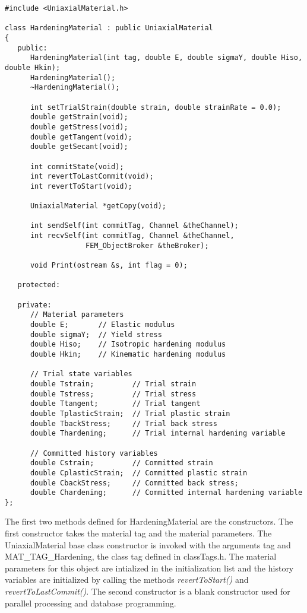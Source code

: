 \documentclass[12pt]{article}
\begin{document}
{\sf\small
\begin{verbatim}
#include <UniaxialMaterial.h>

class HardeningMaterial : public UniaxialMaterial
{
   public:
      HardeningMaterial(int tag, double E, double sigmaY, double Hiso, double Hkin);
      HardeningMaterial();
      ~HardeningMaterial();

      int setTrialStrain(double strain, double strainRate = 0.0); 
      double getStrain(void);          
      double getStress(void);
      double getTangent(void);
      double getSecant(void);

      int commitState(void);
      int revertToLastCommit(void);    
      int revertToStart(void);        

      UniaxialMaterial *getCopy(void);
    
      int sendSelf(int commitTag, Channel &theChannel);  
      int recvSelf(int commitTag, Channel &theChannel, 
                   FEM_ObjectBroker &theBroker);    
    
      void Print(ostream &s, int flag = 0);
    
   protected:
    
   private:
      // Material parameters
      double E;       // Elastic modulus
      double sigmaY;  // Yield stress
      double Hiso;    // Isotropic hardening modulus
      double Hkin;    // Kinematic hardening modulus
	
      // Trial state variables
      double Tstrain;         // Trial strain
      double Tstress;         // Trial stress
      double Ttangent;        // Trial tangent
      double TplasticStrain;  // Trial plastic strain
      double TbackStress;     // Trial back stress
      double Thardening;      // Trial internal hardening variable
	
      // Committed history variables
      double Cstrain;         // Committed strain
      double CplasticStrain;  // Committed plastic strain
      double CbackStress;     // Committed back stress;
      double Chardening;      // Committed internal hardening variable
};
\end{verbatim}
}

\noindent The first two methods defined for HardeningMaterial are the constructors. The
first constructor takes the material tag and the material parameters. The UniaxialMaterial
base class constructor is invoked with the arguments tag and MAT\_TAG\_Hardening, the class
tag defined in classTags.h. The material parameters for this object are intialized in
the initialization list
and the history variables are initialized by calling the methods {\em revertToStart()} and
{\em revertToLastCommit()}. The second constructor is a blank constructor used for parallel
processing and database programming.
\end{document}
